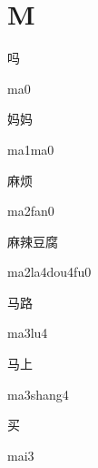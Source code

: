 ﻿%
\section*{M}
\begin{multicols*}{2}

\begin{verbete}[ma0]{吗}
\begin{pronuncia}{ma0}
\end{pronuncia}
\end{verbete}

\begin{verbete}[ma1ma0]{妈妈}
\begin{pronuncia}{ma1ma0}
\end{pronuncia}
\end{verbete}

\begin{verbete}[ma2fan0]{麻烦}
\begin{pronuncia}{ma2fan0}
\end{pronuncia}
\end{verbete}

\begin{verbete}[ma2la4dou4fu0]{麻辣豆腐}
\begin{pronuncia}{ma2la4dou4fu0}
\end{pronuncia}
\end{verbete}

\begin{verbete}[ma3lu4]{马路}
\begin{pronuncia}{ma3lu4}
\end{pronuncia}
\end{verbete}

\begin{verbete}[ma3shang4]{马上}
\begin{pronuncia}{ma3shang4}
\end{pronuncia}
\end{verbete}

\begin{verbete}[mai3]{买}
\begin{pronuncia}{mai3}
\end{pronuncia}
\end{verbete}


\end{multicols*}
